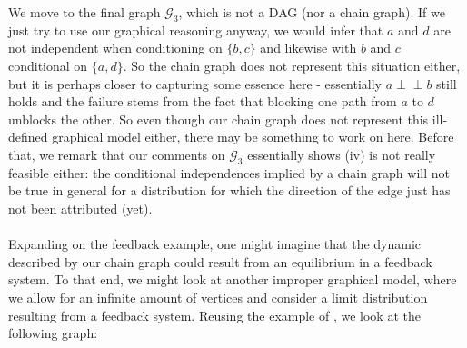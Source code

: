 \documentclass[11pt, a4paper]{memoir}
\theoremstyle{break}
\theoremstyle{break}
\theoremstyle{nonumberplain}
\newcommand{\indep}{\perp \!\!\! \perp}
\begin{document}
We move to the final graph $\mathcal{G}_3$, which is not a DAG (nor a chain graph). If we just try to use our graphical reasoning anyway, we would infer that $a$ and $d$ are not independent when conditioning on $\{b,c\}$ and likewise with $b$ and $c$ conditional on $\{a,d\}$. So the chain graph does not represent this situation either, but it is perhaps closer to capturing some essence here - essentially $a\indep b$ still holds and the failure stems from the fact that blocking one path from $a$ to $d$ unblocks the other. So even though our chain graph does not represent this ill-defined graphical model either, there may be something to work on here. Before that, we remark that our comments on $\mathcal{G}_3$ essentially  shows (iv) is not really feasible either: the conditional independences implied by a chain graph will not be true in general for a distribution for which the direction of the edge just has not been attributed (yet).\\\\
Expanding on the feedback example, one might imagine that the dynamic described by our chain graph could result from an equilibrium in a feedback system. To that end, we might look at another improper graphical model, where we allow for an infinite amount of vertices and consider a limit distribution resulting from a feedback system. Reusing the example of \cite{ChainGraph}, we look at the following graph:
\begin{figure}[H]
  \centering
\end{figure}
\end{document}
